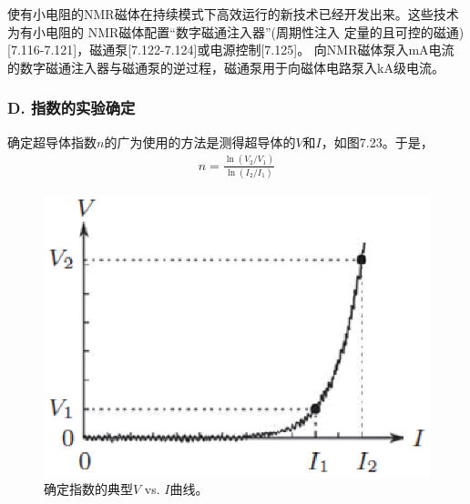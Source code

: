 使有小电阻的NMR磁体在持续模式下高效运行的新技术已经开发出来。这些技术为有小电阻的
NMR磁体配置“数字磁通注入器”(周期性注入
定量的且可控的磁通)[7.116-7.121]，磁通泵[7.122-7.124]或电源控制[7.125]。
向NMR磁体泵入mA电流的数字磁通注入器与磁通泵的逆过程，磁通泵用于向磁体电路泵入kA级电流。

\subsubsection*{D. 指数的实验确定}
确定超导体指数$n$的广为使用的方法是测得超导体的$V$和$I$，如图7.23。于是，
\begin{align*}%
n=\frac{\ln(V_2/V_1)}{\ln(I_2/I_1)} \tag{7.48}
\end{align*}

\begin{figure}[htbp]
	\centering
	\includegraphics[scale=0.7]{chpt7/figs/fig7.23.eps}
	\caption{确定指数的典型$V$ vs. $I$曲线。}
\end{figure}



